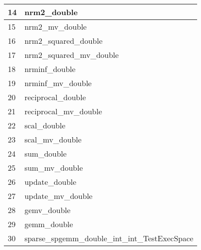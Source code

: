 \begin{table}[!htbp]
{\begin{tabular}{|>{\columncolor[HTML]{34FF34}}l |l|}
            14                         & nrm2\_double                                                        \\ \hline
            15                         & nrm2\_mv\_double                                                    \\ \hline
            16                         & nrm2\_squared\_double                                               \\ \hline
            17                         & nrm2\_squared\_mv\_double                                           \\ \hline
            \cellcolor[HTML]{FE0000}18 & nrminf\_double                                                      \\ \hline
            \cellcolor[HTML]{FE0000}19 & nrminf\_mv\_double                                                  \\ \hline
            \cellcolor[HTML]{FE0000}20 & reciprocal\_double                                                  \\ \hline
            \cellcolor[HTML]{FE0000}21 & reciprocal\_mv\_double                                              \\ \hline
            22                         & scal\_double                                                        \\ \hline
            23                         & scal\_mv\_double                                                    \\ \hline
            24                         & sum\_double                                                         \\ \hline
            25                         & sum\_mv\_double                                                     \\ \hline
            26                         & update\_double                                                      \\ \hline
            27                         & update\_mv\_double                                                  \\ \hline
            \cellcolor[HTML]{D1B3FF}28 & gemv\_double                                                        \\ \hline
            \cellcolor[HTML]{D1B3FF}29 & gemm\_double                                                        \\ \hline
            \cellcolor[HTML]{FF00FF}30 & sparse\_spgemm\_double\_int\_int\_TestExecSpace                     \\ \hline

\end{tabular}}
\end{table}
